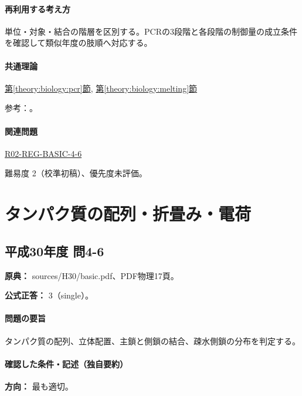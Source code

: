 \paragraph{再利用する考え方} 単位・対象・結合の階層を区別する。PCRの3段階と各段階の制御量の成立条件を確認して類似年度の肢順へ対応する。

\paragraph{共通理論} \hyperref[theory:biology:pcr]{第\ref*{theory:biology:pcr}節}, \hyperref[theory:biology:melting]{第\ref*{theory:biology:melting}節}

\par 参考：\cite{neb_pcr}。

\paragraph{関連問題} \hyperref[q:r02-reg-basic-4-6]{R02-REG-BASIC-4-6}

\par 難易度 2（校準初稿）、優先度未評価。

\section{タンパク質の配列・折畳み・電荷}

\subsection{平成30年度 問4-6}
\label{q:h30-reg-basic-4-6}

\noindent\textbf{原典：} sources/H30/basic.pdf、PDF物理17頁。

\textbf{公式正答：} 3（single）。

\paragraph{問題の要旨} タンパク質の配列、立体配置、主鎖と側鎖の結合、疎水側鎖の分布を判定する。

\paragraph{確認した条件・記述（独自要約）}\mbox{}\par

\noindent\textbf{方向：} 最も適切。\par

